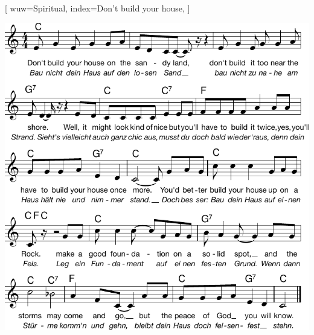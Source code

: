 [
    wuw={Spiritual}, 
    index={Don't build your house},
]


\beginverse
\endverse
\includegraphics[draft=false, width=1\textwidth]{Noten/Lied116.pdf}

\endsong
